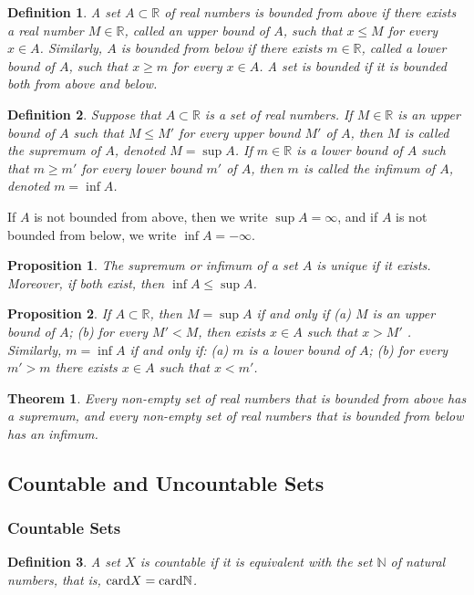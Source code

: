 \documentclass[a4paper,12pt]{article} %
\newtheorem{definition}{Definition}[section]
\newtheorem{theorem}{Theorem}[section]
\newtheorem{proposition}{Proposition}[section]
\begin{document}
\begin{definition}
    A set $A \subset \mathbb{R}$ of real numbers is bounded from 
    above if there exists a real number $M \in \mathbb{R}$, 
    called an upper bound of $A$, such that $x \le M$ for 
    every $x \in A$. Similarly, $A$ is bounded from below if 
    there exists $m \in \mathbb{R}$, called a lower bound of 
    $A$, such that $x \ge m$ for every $x \in A$. A set is bounded 
    if it is bounded both from above and below.
\end{definition}

\begin{definition}
    Suppose that $A \subset \mathbb{R}$ is a set of real numbers. If
    $M \in \mathbb{R}$ is an upper bound of $A$ such that $M \le M'$ for 
    every upper bound $M'$ of $A$, then $M$ is called the supremum of 
    $A$, denoted $M = \sup A$. If $m \in \mathbb{R}$ is a lower bound 
    of $A$ such that $m \ge m'$ for every lower bound $m'$ of $A$, then 
    $m$ is called the infimum of $A$, denoted $m = \inf A$.
\end{definition}

If $A$ is not bounded from above, then we write $\sup A = \infty$, 
and if $A$ is not bounded from below, we write $\inf A = -\infty$.

\begin{proposition}
    The supremum or infimum of a set $A$ is unique if it exists.
    Moreover, if both exist, then $\inf A \le \sup A$.
\end{proposition}

\begin{proposition}
    If $A \subset \mathbb{R}$, then $M = \sup A$ if and only if 
    (a) $M$ is an upper bound of $A$; (b) for every $M' < M$,
    then exists $x \in A$ such that $x > M'$ . Similarly, 
    $m = \inf A$ if and only if: (a) $m$ is a lower bound of $A$;
    (b) for every $m' > m$ there exists $x \in A$ such that $x < m'$.
\end{proposition}

\begin{theorem}
    Every non-empty set of real numbers that is bounded from
    above has a supremum, and every non-empty set of real 
    numbers that is bounded from below has an infimum.
\end{theorem}
\subsection{Countable and Uncountable Sets}
\subsubsection{Countable Sets}
\begin{definition}
    A set $X$ is countable if it is equivalent with the set $\mathbb{N}$ 
    of natural numbers, that is, ${\rm card} X = {\rm card}\mathbb{N} $.
\end{definition}
\end{document}
